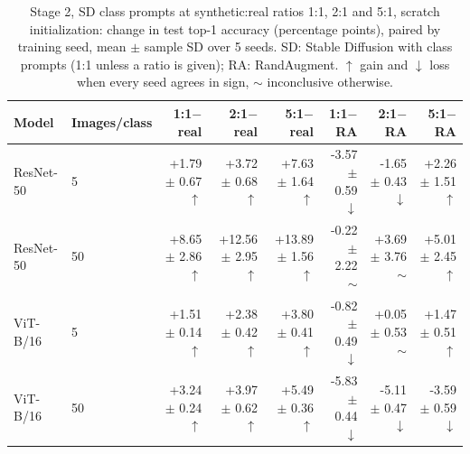 \begin{table}[H]
\centering
\small
\setlength{\tabcolsep}{4pt}
\caption{Stage 2, SD class prompts at synthetic:real ratios 1:1, 2:1 and 5:1, scratch initialization: change in test top-1 accuracy (percentage points), paired by training seed, mean $\pm$ sample SD over 5 seeds. SD: Stable Diffusion with class prompts (1:1 unless a ratio is given); RA: RandAugment. $\uparrow$ gain and $\downarrow$ loss when every seed agrees in sign, $\sim$ inconclusive otherwise.}
\label{tab:stage2-ratio-scratch-test}
\begin{tabular}{llrrrrrr}
\toprule
Model & Images/class & 1:1$-$real & 2:1$-$real & 5:1$-$real & 1:1$-$RA & 2:1$-$RA & 5:1$-$RA \\
\midrule
ResNet-50 & 5 & +1.79 $\pm$ 0.67 $\uparrow$ & +3.72 $\pm$ 0.68 $\uparrow$ & +7.63 $\pm$ 1.64 $\uparrow$ & -3.57 $\pm$ 0.59 $\downarrow$ & -1.65 $\pm$ 0.43 $\downarrow$ & +2.26 $\pm$ 1.51 $\uparrow$ \\
ResNet-50 & 50 & +8.65 $\pm$ 2.86 $\uparrow$ & +12.56 $\pm$ 2.95 $\uparrow$ & +13.89 $\pm$ 1.56 $\uparrow$ & -0.22 $\pm$ 2.22 $\sim$ & +3.69 $\pm$ 3.76 $\sim$ & +5.01 $\pm$ 2.45 $\uparrow$ \\
\midrule
ViT-B/16 & 5 & +1.51 $\pm$ 0.14 $\uparrow$ & +2.38 $\pm$ 0.42 $\uparrow$ & +3.80 $\pm$ 0.41 $\uparrow$ & -0.82 $\pm$ 0.49 $\downarrow$ & +0.05 $\pm$ 0.53 $\sim$ & +1.47 $\pm$ 0.51 $\uparrow$ \\
ViT-B/16 & 50 & +3.24 $\pm$ 0.24 $\uparrow$ & +3.97 $\pm$ 0.62 $\uparrow$ & +5.49 $\pm$ 0.36 $\uparrow$ & -5.83 $\pm$ 0.44 $\downarrow$ & -5.11 $\pm$ 0.47 $\downarrow$ & -3.59 $\pm$ 0.59 $\downarrow$ \\
\bottomrule
\end{tabular}
\end{table}
